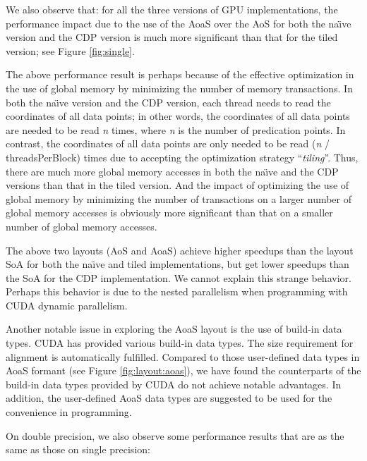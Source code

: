 We also observe that: for all the three versions of GPU implementations, the 
performance impact due to the use of the AoaS over the AoS for both the 
na\"{\i}ve version and the CDP version is much more significant than that 
for the tiled version; see Figure \ref{fig:single}.

The above performance result is perhaps because of the effective 
optimization in the use of global memory by minimizing the number of memory 
transactions. In both the na\"{\i}ve version and the CDP version, each 
thread needs to read the coordinates of all data points; in other words, the 
coordinates of all data points are needed to be read \textit{n} times, where \textit{n} is the 
number of predication points. In contrast, the coordinates of all data 
points are only needed to be read (\textit{n} / threadsPerBlock) times due to 
accepting the optimization strategy ``\textit{tiling}''. Thus, there are much 
more global memory accesses in both the na\"{\i}ve and the CDP versions than 
that in the tiled version. And the impact of optimizing the use of global 
memory by minimizing the number of transactions on a larger number of global 
memory accesses is obviously more significant than that on a smaller number 
of global memory accesses. 

The above two layouts (AoS and AoaS) achieve higher speedups than the layout 
SoA for both the na\"{\i}ve and tiled implementations, but get lower 
speedups than the SoA for the CDP implementation. We cannot explain this 
strange behavior. Perhaps this behavior is due to the nested parallelism 
when programming with CUDA dynamic parallelism.

Another notable issue in exploring the AoaS layout is the use of build-in data types. CUDA has provided various build-in data types. The size requirement for alignment is automatically fulfilled. 
Compared to those user-defined data types in AoaS formant (see Figure \ref{fig:layout:aoas}), we have found the counterparts of the build-in data types provided by CUDA do not achieve notable advantages. In addition, the user-defined AoaS data types are suggested to be used for the convenience in programming. 


On double precision, we also observe some performance results that are 
as the same as those on single precision:

